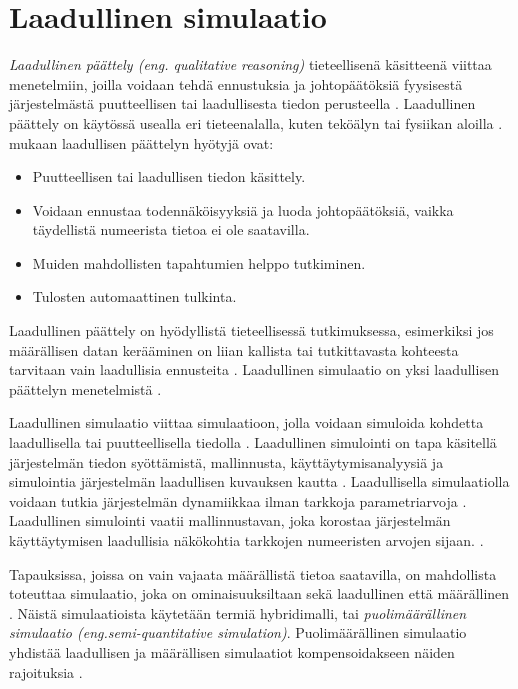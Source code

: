 \documentclass[utf8]{gradu3}
\begin{document}
\section{Laadullinen simulaatio} \label{laadullinen simulaatio}
\textit{Laadullinen päättely (eng. qualitative reasoning)} 
tieteellisenä käsitteenä viittaa menetelmiin, joilla
voidaan tehdä ennustuksia ja johtopäätöksiä fyysisestä järjestelmästä puutteellisen tai laadullisesta tiedon perusteella
\parencite{QualitativeReasoning1997}. 
Laadullinen päättely on käytössä usealla eri tieteenalalla, kuten teköälyn \parencite[luku~35]{qualitativeReasoning2014} tai fysiikan aloilla \parencite{QualitativePhysics1988}.
\textcite{QualitativeReasoning1997} mukaan laadullisen päättelyn hyötyjä ovat:
\begin{itemize}
    \item Puutteellisen tai laadullisen tiedon käsittely.
    \item Voidaan ennustaa todennäköisyyksiä ja luoda johtopäätöksiä, 
    vaikka täydellistä numeerista tietoa ei ole saatavilla.
    \item Muiden mahdollisten tapahtumien helppo tutkiminen.
    \item Tulosten automaattinen tulkinta. 
\end{itemize}
Laadullinen päättely on hyödyllistä tieteellisessä tutkimuksessa, esimerkiksi jos 
määrällisen datan kerääminen on liian kallista tai 
tutkittavasta kohteesta tarvitaan vain laadullisia ennusteita
\parencite{QualitativeReasoning1997}.
Laadullinen simulaatio on yksi laadullisen päättelyn menetelmistä \parencite{kuipers1986qualitative}. 

Laadullinen simulaatio viittaa simulaatioon, jolla voidaan simuloida kohdetta
laadullisella tai puutteellisella tiedolla \parencite{kuipers1986qualitative}.
Laadullinen simulointi on tapa käsitellä järjestelmän tiedon syöttämistä, 
mallinnusta, käyttäytymisanalyysiä ja simulointia järjestelmän 
laadullisen kuvauksen kautta \parencite{QualSimTheoryApplications2013}.
Laadullisella simulaatiolla voidaan tutkia järjestelmän dynamiikkaa 
ilman tarkkoja parametriarvoja \parencite{cosme2023history}. 
Laadullinen simulointi vaatii mallinnustavan, 
joka korostaa järjestelmän käyttäytymisen laadullisia näkökohtia 
tarkkojen numeeristen arvojen sijaan. 
%
\parencites%
  {parallelQualitativeSimulation1997}%
  {kuipers1986qualitative}%
\relax.
%

Tapauksissa, joissa on vain vajaata määrällistä tietoa saatavilla,
on mahdollista toteuttaa simulaatio, 
joka on ominaisuuksiltaan sekä laadullinen että määrällinen 
\parencite{semiHybrid1997qualitative}. 
Näistä simulaatioista käytetään termiä hybridimalli, tai
\textit{ puolimäärällinen simulaatio 
(eng.semi-quantitative simulation)}. 
Puolimäärällinen simulaatio yhdistää laadullisen ja määrällisen simulaatiot
kompensoidakseen näiden rajoituksia \parencite{semiHybrid1997qualitative}.
\end{document}
